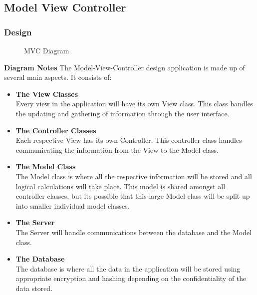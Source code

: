 \documentclass[a4paper]{article}
\begin{document}
\subsection{Model View Controller}
\subsubsection{Design}
\begin{figure}[!ht] 
    \centering{} 
    \caption{MVC Diagram}
    \label{fig:mvc}
\end{figure}

\break
\textbf{Diagram Notes}
The Model-View-Controller design application is made up of several main aspects. It consists of: 
\begin{itemize}
    \item \textbf{The View Classes} \\ 
    Every view in the application will have its own View class. This class handles the updating and gathering of information through the user interface. \\
    \item \textbf{The Controller Classes} \\ 
    Each respective View has its own Controller. This controller class handles communicating the information from the View to the Model class. \\
    \item \textbf{The Model Class} \\ 
    The Model class is where all the respective information will be stored and all logical calculations will take place. This model is shared amongst all controller classes, but its possible that this large Model class will be split up into smaller individual model classes. \\
    \item \textbf{The Server} \\ 
    The Server will handle communications between the database and the Model class. \\
    \item \textbf{The Database} \\ 
    The database is where all the data in the application will be stored using appropriate encryption and hashing depending on the confidentiality of the data stored.
\end{itemize}
\end{document}
